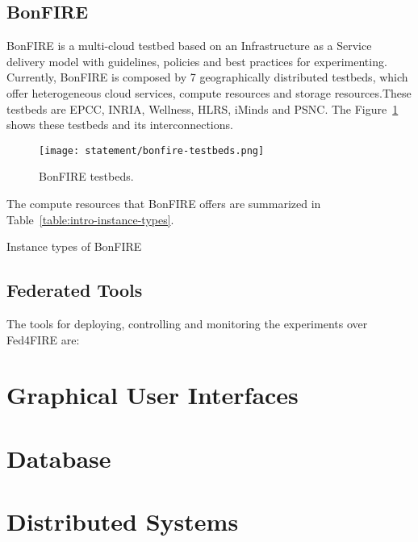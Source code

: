\subsection{BonFIRE}

BonFIRE is a multi-cloud testbed based on an Infrastructure as a Service
delivery model with guidelines, policies and best practices for
experimenting. Currently, BonFIRE is composed by 7 geographically distributed
testbeds, which offer heterogeneous cloud services, compute resources and
storage resources.These testbeds are EPCC, INRIA, Wellness, HLRS, iMinds and
PSNC. The Figure~\ref{fig:intr-bonfire-testbeds} shows these testbeds and its interconnections.

\begin{figure}[!h]
\begin{center}
\texttt{[image: statement/bonfire-testbeds.png]}
\caption{BonFIRE testbeds.}
\label{fig:intr-bonfire-testbeds}
\end{center}
\end{figure}

The compute resources that BonFIRE offers are summarized in Table~\ref{table:intro-instance-types}.

\begin{table}[hp]
  \centering
  {\small
  
  }
  \caption{Instance types of BonFIRE}
  \label{table:intro-instance-types}
\end{table}


   

\subsection{Federated Tools}

The tools for deploying, controlling and monitoring the experiments over
Fed4FIRE are:





\section{Graphical User Interfaces}

\section{Database}

\section{Distributed Systems}

